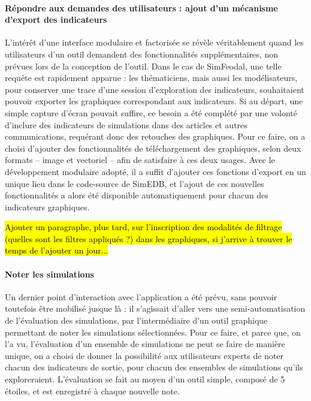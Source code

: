 			\paragraph*{Répondre aux demandes des utilisateurs : ajout d'un mécanisme d'export des indicateurs}
			
			L'intérêt d'une interface modulaire et factorisée se révèle véritablement quand les utilisateurs d'un outil demandent des fonctionnalités supplémentaires, non prévues lors de la conception de l'outil.
			Dans le cas de SimFeodal, une telle requête est rapidement apparue : les thématiciens, mais aussi les modélisateurs, pour conserver une trace d'une session d'exploration des indicateurs, souhaitaient pouvoir exporter les graphiques correspondant aux indicateurs.
			Si au départ, une simple capture d'écran pouvait suffire, ce besoin a été complété par une volonté d'inclure des indicateurs de simulations dans des articles et autres communications, requérant donc des retouches des graphiques.
			Pour ce faire, on a choisi d'ajouter des fonctionnalités de téléchargement des graphiques, selon deux formats -- image et vectoriel -- afin de satisfaire à ces deux usages.
			Avec le développement modulaire adopté, il a suffit d'ajouter ces fonctions d'export en un unique lieu dans le code-source de SimEDB, et l'ajout de ces nouvelles fonctionnalités a alors été disponible automatiquement pour chacun des indicateurs graphiques.
			
			\medskip
			\hl{Ajouter un paragraphe, plus tard, sur l'inscription des modalités de filtrage (quelles sont les filtres appliqués ?) dans les graphiques, si j'arrive à trouver le temps de l'ajouter un jour...}
			
			\paragraph*{Noter les simulations}
			
			Un dernier point d'interaction avec l'application a été prévu, sans pouvoir toutefois être mobilisé jusque là : il s'agissait d'aller vers une semi-automatisation de l'évaluation des simulations, par l'intermédiaire d'un outil graphique permettant de \og noter\fg{} les simulations sélectionnées.
			Pour ce faire, et parce que, on l'a vu, l'évaluation d'un ensemble de simulations ne peut se faire de manière unique, on a choisi de donner la possibilité aux utilisateurs experts de noter chacun des indicateurs de sortie, pour chacun des ensembles de simulations qu'ils exploreraient.
			L'évaluation se fait au moyen d'un outil simple, composé de 5 \og étoiles\fg{}, et est enregistré à chaque nouvelle note.
			
